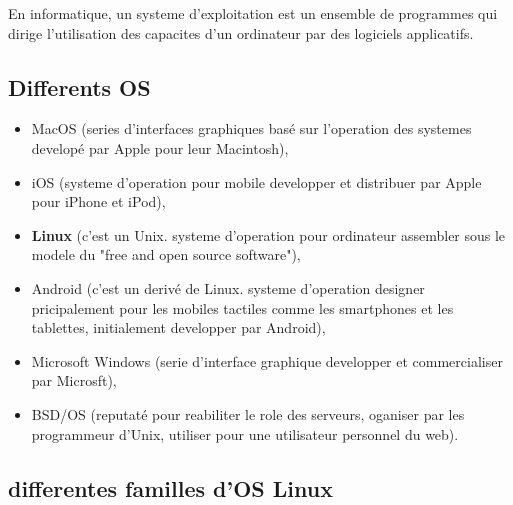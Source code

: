 En informatique, un systeme d'exploitation est un ensemble de programmes qui dirige l'utilisation des capacites d'un ordinateur par des logiciels applicatifs.\newline


\subsection{Differents OS}
\begin{itemize}
\item MacOS (series d'interfaces graphiques basé sur l'operation des systemes developé par Apple pour leur Macintosh),
\item iOS (systeme d'operation pour mobile developper et distribuer par Apple pour iPhone et iPod),
\item \textbf{Linux} (c'est un Unix. systeme d'operation pour ordinateur assembler sous le modele du "free and open source software"),
\item Android (c'est un derivé de Linux. systeme d'operation designer pricipalement pour les mobiles tactiles comme les smartphones et les tablettes, initialement developper par Android),
\item Microsoft Windows (serie d'interface graphique developper et commercialiser par Microsft),
\item BSD/OS (reputaté pour reabiliter le role des serveurs, oganiser par les programmeur d'Unix, utiliser pour une utilisateur personnel du web).\newline
\end{itemize}


\subsection{differentes familles d'OS Linux} 

